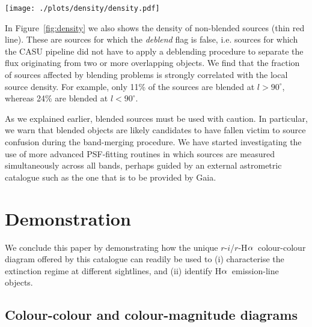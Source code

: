 \documentclass[useAMS,usenatbib]{mn2e}
\def\ha{\mbox{H$\rm \alpha$}}
\begin{document}
\begin{figure*}
    \texttt{[image: ./plots/density/density.pdf]} 
    \caption{Mean number density of sources in the catalogue 
    as a function of Galactic longitude, 
    with and without blended sources included. 
    The densities shown were computed by counting the sources 
    at each longitude between $-5^\circ<b<+5^\circ$ (upper blue line).
    We also show the densities based on only counting those sources 
    for which the \emph{deblend} flag is {\sc false}, 
    i.e. unconfused sources for which the CASU pipeline did not have to apply 
    a deblending procedure (lower red line). 
    }
    \label{fig:density}
\end{figure*}

In Figure~\ref{fig:density} we also shows the density
of non-blended sources (thin red line).
These are sources for which the \emph{deblend} flag is {\sc false},
i.e. sources for which the CASU pipeline did not have to apply 
a deblending procedure to separate the flux
originating from two or more overlapping objects.
We find that the fraction of sources affected by blending problems
is strongly correlated with the local source density.
For example, only 11\% of the sources are blended
at $l>90^\circ$, whereas 24\% are blended at $l<90^\circ$.

As we explained earlier, blended sources must be used with caution.
In particular, we warn that blended objects
are likely candidates to have fallen victim
to source confusion during the band-merging procedure.
We have started investigating the use of
more advanced PSF-fitting routines
in which sources are measured simultaneously across all bands,
perhaps guided by an external astrometric catalogue such as the one
that is to be provided by Gaia.

\section{Demonstration}
\label{sec:demonstration}

We conclude this paper by demonstrating how the unique
$r$-$i$/$r$-\ha\ colour-colour diagram offered by this catalogue
can readily be used to
(i) characterise the extinction regime at different sightlines, and
(ii) identify \ha\ emission-line objects.

\subsection{Colour-colour and colour-magnitude diagrams}
\end{document}
